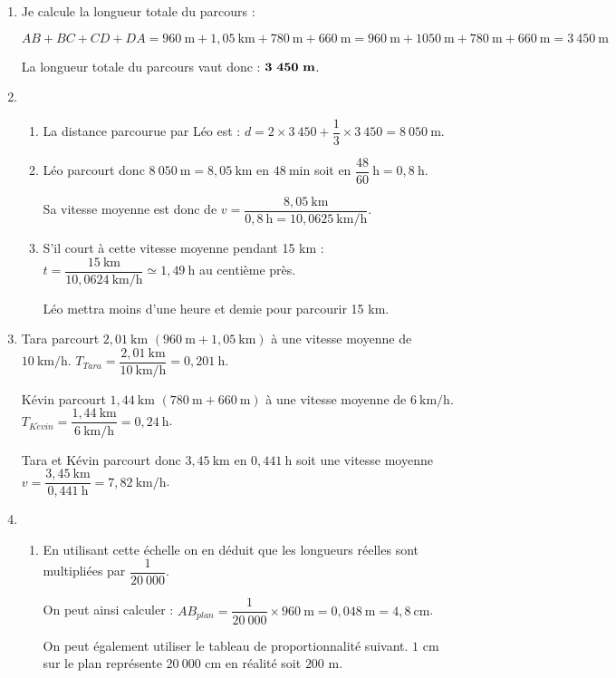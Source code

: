 \begin{enumerate}
\item Je calcule la longueur totale du parcours :

$AB + BC + CD + DA = 960~\text{m} + 1,05~\text{km} + 780~\text{m} + 660~\text{m} = 960~\text{m} + 1050~\text{m} + 780~\text{m} + 660~\text{m} = 3~450~\text{m}$

La longueur totale du parcours vaut donc : $\mathbf{3~450~\text{\textbf{m}}}$.
\item 
	\begin{enumerate}
		\item La distance parcourue par Léo est : $ d = 2 \times 3~450+\dfrac{1}{3}\times 3~450 = 8~050~\text{m}$.
		\item Léo parcourt donc $8~050~\text{m} = 8,05~\text{km}$ en $48~\text{min}$ soit en $\dfrac{48}{60}~\text{h} = 0,8~\text{h}$.
		
		Sa vitesse moyenne est donc de $v=\dfrac{8,05~\text{km}}{0,8~\text{h}=10,0625~\text{km/h}}$.
		\item S'il court à cette vitesse moyenne pendant 15 km : $t=\dfrac{15~\text{km}}{10,0624~\text{km/h}} \simeq 1,49~\text{h}$ au centième près.
		
		Léo mettra moins d’une heure et demie pour parcourir 15 km.
	\end{enumerate}
\item Tara parcourt $2,01~\text{km}$ $(960~\text{m} + 1,05~\text{km})$ à une vitesse moyenne de $10~\text{km/h}$. $T_{Tara}=\dfrac{2,01~\text{km}}{10~\text{km/h}}=0,201~\text{h}$.

Kévin parcourt $1,44~\text{km}$ $(780~\text{m} + 660~\text{m})$ à une vitesse moyenne de $6~\text{km/h}$.
$T_{K\acute{e}vin}=\dfrac{1,44~\text{km}}{6~\text{km/h}}=0,24~\text{h}$.

Tara et Kévin parcourt donc $3,45~\text{km}$ en $0,441~\text{h}$ soit une vitesse moyenne
$v=\dfrac{3,45~\text{km}}{0,441~\text{h}}=7,82~\text{km/h}$.
\item 
	\begin{enumerate}
		\item En utilisant cette échelle on en déduit que les longueurs réelles sont multipliées par $\dfrac{1}{20~000}$.
		
		On peut ainsi calculer : $AB_{plan}= \dfrac{1}{20~000}\times 960~\text{m}=0,048~\text{m}=4,8~\text{cm}$.
		
		On peut également utiliser le tableau de proportionnalité suivant. $1$ cm sur le plan représente $20~000$ cm en réalité soit $200$ m.
		

\end{enumerate}
\end{enumerate}
